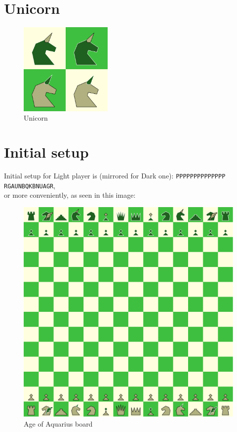 \documentclass[a5paper,12pt,draft]{book} %
\begin{document}
\section*{Unicorn}

\noindent
\begin{figure}
\includegraphics[width=0.4\textwidth, keepaspectratio=true]{../gfx/pieces/09_unicorn.png}
\caption{Unicorn}
\label{fig:unicorn}
\end{figure}

\clearpage

\section*{Initial setup}

Initial setup for Light player is (mirrored for Dark one):
\texttt{PPPPPPPPPPPPPP \\
        RGAUNBQKBNUAGR}, \\
or more conveniently, as seen in this image:

\noindent
\begin{figure}[h]
\includegraphics[width=1.0\textwidth, keepaspectratio=true]{../gfx/boards/08_age_of_aquarius.png}
\caption{Age of Aquarius board}
\label{fig:age_of_aquarius}
\end{figure}
\end{document}

